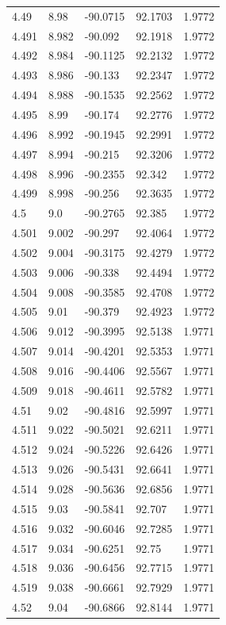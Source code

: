 \begin{tabular}{lllll}
4.49 & 8.98 & -90.0715 & 92.1703 & 1.9772 \\
4.491 & 8.982 & -90.092 & 92.1918 & 1.9772 \\
4.492 & 8.984 & -90.1125 & 92.2132 & 1.9772 \\
4.493 & 8.986 & -90.133 & 92.2347 & 1.9772 \\
4.494 & 8.988 & -90.1535 & 92.2562 & 1.9772 \\
4.495 & 8.99 & -90.174 & 92.2776 & 1.9772 \\
4.496 & 8.992 & -90.1945 & 92.2991 & 1.9772 \\
4.497 & 8.994 & -90.215 & 92.3206 & 1.9772 \\
4.498 & 8.996 & -90.2355 & 92.342 & 1.9772 \\
4.499 & 8.998 & -90.256 & 92.3635 & 1.9772 \\
4.5 & 9.0 & -90.2765 & 92.385 & 1.9772 \\
4.501 & 9.002 & -90.297 & 92.4064 & 1.9772 \\
4.502 & 9.004 & -90.3175 & 92.4279 & 1.9772 \\
4.503 & 9.006 & -90.338 & 92.4494 & 1.9772 \\
4.504 & 9.008 & -90.3585 & 92.4708 & 1.9772 \\
4.505 & 9.01 & -90.379 & 92.4923 & 1.9772 \\
4.506 & 9.012 & -90.3995 & 92.5138 & 1.9771 \\
4.507 & 9.014 & -90.4201 & 92.5353 & 1.9771 \\
4.508 & 9.016 & -90.4406 & 92.5567 & 1.9771 \\
4.509 & 9.018 & -90.4611 & 92.5782 & 1.9771 \\
4.51 & 9.02 & -90.4816 & 92.5997 & 1.9771 \\
4.511 & 9.022 & -90.5021 & 92.6211 & 1.9771 \\
4.512 & 9.024 & -90.5226 & 92.6426 & 1.9771 \\
4.513 & 9.026 & -90.5431 & 92.6641 & 1.9771 \\
4.514 & 9.028 & -90.5636 & 92.6856 & 1.9771 \\
4.515 & 9.03 & -90.5841 & 92.707 & 1.9771 \\
4.516 & 9.032 & -90.6046 & 92.7285 & 1.9771 \\
4.517 & 9.034 & -90.6251 & 92.75 & 1.9771 \\
4.518 & 9.036 & -90.6456 & 92.7715 & 1.9771 \\
4.519 & 9.038 & -90.6661 & 92.7929 & 1.9771 \\
4.52 & 9.04 & -90.6866 & 92.8144 & 1.9771 \\

\end{tabular}
